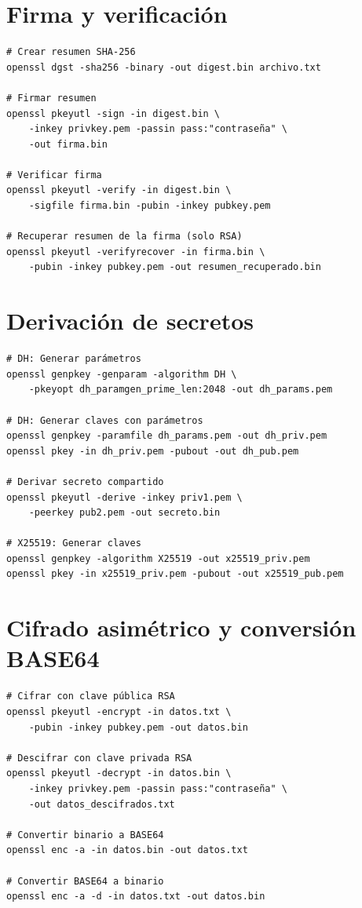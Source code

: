 \documentclass[12pt,a4paper]{report}
\begin{document}
\section{Firma y verificación}

\begin{lstlisting}[caption=Comandos para firma digital]
# Crear resumen SHA-256
openssl dgst -sha256 -binary -out digest.bin archivo.txt

# Firmar resumen
openssl pkeyutl -sign -in digest.bin \
    -inkey privkey.pem -passin pass:"contraseña" \
    -out firma.bin

# Verificar firma
openssl pkeyutl -verify -in digest.bin \
    -sigfile firma.bin -pubin -inkey pubkey.pem

# Recuperar resumen de la firma (solo RSA)
openssl pkeyutl -verifyrecover -in firma.bin \
    -pubin -inkey pubkey.pem -out resumen_recuperado.bin
\end{lstlisting}

\section{Derivación de secretos}

\begin{lstlisting}[caption=Comandos para derivación DH y X25519]
# DH: Generar parámetros
openssl genpkey -genparam -algorithm DH \
    -pkeyopt dh_paramgen_prime_len:2048 -out dh_params.pem

# DH: Generar claves con parámetros
openssl genpkey -paramfile dh_params.pem -out dh_priv.pem
openssl pkey -in dh_priv.pem -pubout -out dh_pub.pem

# Derivar secreto compartido
openssl pkeyutl -derive -inkey priv1.pem \
    -peerkey pub2.pem -out secreto.bin

# X25519: Generar claves
openssl genpkey -algorithm X25519 -out x25519_priv.pem
openssl pkey -in x25519_priv.pem -pubout -out x25519_pub.pem
\end{lstlisting}

\section{Cifrado asimétrico y conversión BASE64}

\begin{lstlisting}[caption=Comandos para cifrado asimétrico]
# Cifrar con clave pública RSA
openssl pkeyutl -encrypt -in datos.txt \
    -pubin -inkey pubkey.pem -out datos.bin

# Descifrar con clave privada RSA
openssl pkeyutl -decrypt -in datos.bin \
    -inkey privkey.pem -passin pass:"contraseña" \
    -out datos_descifrados.txt

# Convertir binario a BASE64
openssl enc -a -in datos.bin -out datos.txt

# Convertir BASE64 a binario
openssl enc -a -d -in datos.txt -out datos.bin
\end{lstlisting}
\end{document}
